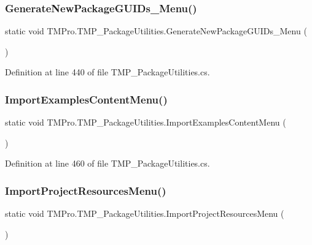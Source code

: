 \subsubsection{\texorpdfstring{GenerateNewPackageGUIDs\_Menu()}{GenerateNewPackageGUIDs\_Menu()}}
{\footnotesize\ttfamily static void T\+M\+Pro.\+T\+M\+P\+\_\+\+Package\+Utilities.\+Generate\+New\+Package\+G\+U\+I\+Ds\+\_\+\+Menu (\begin{DoxyParamCaption}{ }\end{DoxyParamCaption})\hspace{0.3cm}{\ttfamily [static]}}



Definition at line 440 of file T\+M\+P\+\_\+\+Package\+Utilities.\+cs.

\mbox{\label{class_t_m_pro_1_1_t_m_p___package_utilities_aa73bd06e0ec78098db6c2d895bf8412e}} 
\subsubsection{\texorpdfstring{ImportExamplesContentMenu()}{ImportExamplesContentMenu()}}
{\footnotesize\ttfamily static void T\+M\+Pro.\+T\+M\+P\+\_\+\+Package\+Utilities.\+Import\+Examples\+Content\+Menu (\begin{DoxyParamCaption}{ }\end{DoxyParamCaption})\hspace{0.3cm}{\ttfamily [static]}}







Definition at line 460 of file T\+M\+P\+\_\+\+Package\+Utilities.\+cs.

\mbox{\label{class_t_m_pro_1_1_t_m_p___package_utilities_a11f7e20b4617d90a5f1da630ed02b0dd}} 
\subsubsection{\texorpdfstring{ImportProjectResourcesMenu()}{ImportProjectResourcesMenu()}}
{\footnotesize\ttfamily static void T\+M\+Pro.\+T\+M\+P\+\_\+\+Package\+Utilities.\+Import\+Project\+Resources\+Menu (\begin{DoxyParamCaption}{ }\end{DoxyParamCaption})\hspace{0.3cm}{\ttfamily [static]}}







